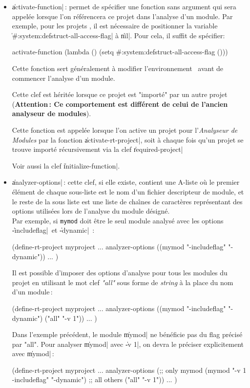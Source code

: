 \begin{itemize}

\item {\Large \|activate-function|}\,: permet de sp\'{e}cifier une
fonction sans argument qui sera appel\'{e}e lorsque l'on r\'{e}f\'{e}rencera ce
projet dans l'analyse d'un module. Par exemple, pour les projets
\Aida, il est n\'{e}cessaire de positionner la variable
\|#:system:defstruct-all-access-flag| \`{a} \|nil|. Pour cela, il suffit
de sp\'{e}cifier:

\begin{Code*}
activate-function (lambda () 
                    (setq #:system:defstruct-all-access-flag ()))
\end{Code*}

Cette fonction sert g\'{e}n\'{e}ralement \`{a} modifier l'environnement \Lisp \
avant de commencer l'analyse d'un module.

Cette clef est h\'{e}rit\'{e}e lorsque ce projet est "import\'{e}" par un
autre projet ({\bf Attention\,: Ce comportement est diff\'{e}rent 
de celui de l'ancien analyseur de modules}).

Cette fonction est appel\'{e}e lorsque l'on active un projet pour
l'{\em Analyseur de Modules} par la fonction \|activate-rt-project|,
soit \`{a} chaque fois qu'un projet se trouve import\'{e} r\'{e}cursivement via
la clef \|required-project|

Voir aussi la clef \|initialize-function|.

\item {\Large \|analyzer-options|}\,: cette clef, si elle existe,
contient une A-liste o\`{u} le premier \'{e}l\'{e}ment de chaque sous-liste est le
nom d'un fichier descripteur de module, et le reste de la sous liste
est une liste de cha\^{\i}nes de caract\`{e}res repr\'{e}sentant des options
utilis\'{e}es lors de l'analyse du module d\'{e}sign\'{e}. \\
Par exemple, si {\tt mymod} doit \^{e}tre le seul module analys\'{e} avec les options
\|-includeflag|\ et \|-dynamic|\ :
\begin{Code*}
(define-rt-project myproject
  ...
  analyzer-options ((mymod "-includeflag" "-dynamic"))
  ...
)
\end{Code*}
Il est possible d'imposer des options d'analyse pour tous les modules
du projet en utilisant le mot clef {\em "all"} sous forme de {\it
string} \`{a} la place du nom d'un module\,:
\begin{Code*}
(define-rt-project myproject
  ...
  analyzer-options ((mymod "-includeflag" "-dynamic")
                    ("all" "-v 1"))
  ...
)
\end{Code*}
Dans l'exemple pr\'{e}c\'{e}dent, le module \|mymod| ne b\'{e}n\'{e}ficie pas du
flag pr\'{e}cis\'{e} par "all". Pour analyser \|mymod| avec \|-v 1|, on
devra le pr\'{e}ciser explicitement avec \|mymod|\,:
\begin{Code*}
(define-rt-project myproject
  ...
  analyzer-options (;; only mymod
                    (mymod "-v 1 -includeflag" "-dynamic")
                    ;; all others
                    ("all" "-v 1"))
  ...
)
\end{Code*}



\end{itemize}
